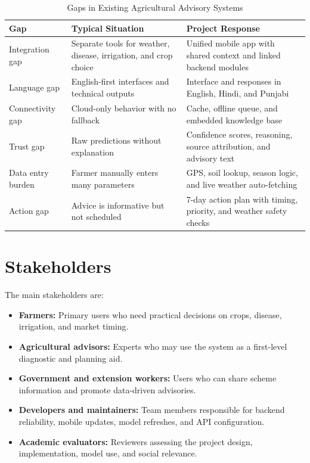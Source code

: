\documentclass[12pt,a4paper]{report}
\begin{document}
\begin{table}[H]
\centering
\caption{Gaps in Existing Agricultural Advisory Systems}
\label{tab:gaps}
\small
\begin{tabular}{p{3.4cm}p{4.7cm}p{4.7cm}}
\toprule
\textbf{Gap} & \textbf{Typical Situation} & \textbf{Project Response} \\
\midrule
Integration gap & Separate tools for weather, disease, irrigation, and crop choice & Unified mobile app with shared context and linked backend modules \\
Language gap & English-first interfaces and technical outputs & Interface and responses in English, Hindi, and Punjabi \\
Connectivity gap & Cloud-only behavior with no fallback & Cache, offline queue, and embedded knowledge base \\
Trust gap & Raw predictions without explanation & Confidence scores, reasoning, source attribution, and advisory text \\
Data entry burden & Farmer manually enters many parameters & GPS, soil lookup, season logic, and live weather auto-fetching \\
Action gap & Advice is informative but not scheduled & 7-day action plan with timing, priority, and weather safety checks \\
\bottomrule
\end{tabular}
\end{table}

\section{Stakeholders}

The main stakeholders are:

\begin{itemize}[leftmargin=1.5em]
  \item \textbf{Farmers:} Primary users who need practical decisions on crops, disease, irrigation, and market timing.
  \item \textbf{Agricultural advisors:} Experts who may use the system as a first-level diagnostic and planning aid.
  \item \textbf{Government and extension workers:} Users who can share scheme information and promote data-driven advisories.
  \item \textbf{Developers and maintainers:} Team members responsible for backend reliability, mobile updates, model refreshes, and API configuration.
  \item \textbf{Academic evaluators:} Reviewers assessing the project design, implementation, model use, and social relevance.
\end{itemize}
\end{document}
